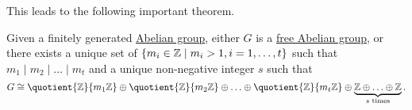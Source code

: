 This leads to the following important theorem.

\begin{theorem}\label{thm:fundamental-theorem-of-finitely-generalted-Abelian-group}
	Given a finitely generated \hyperref[def:Abelian-group]{Abelian group}, either \(G\) is a \hyperref[def:free-Abelian-group]{free Abelian group}, or there exists
	a unique set of \(\{m_{i}\in \mathbb{\MakeUppercase{z}} \mid  m_{i} > 1, i = 1, \ldots , t \}\) such that \(m_1 \mid m_2 \mid \ldots \mid m_t \) and a unique non-negative integer \(s\)
	such that
	\[
		G\cong \quotient{\mathbb{\MakeUppercase{z}} }{m_1 \mathbb{\MakeUppercase{z}} } \oplus \quotient{\mathbb{\MakeUppercase{z}} }{m_2 \mathbb{\MakeUppercase{z}} } \oplus \ldots \oplus \quotient{\mathbb{\MakeUppercase{z}} }{m_t \mathbb{\MakeUppercase{z}} }  \oplus \underbrace{\mathbb{\MakeUppercase{z}} \oplus \ldots \oplus \mathbb{\MakeUppercase{z}}  }_{s \text{ times}}.
	\]
\end{theorem}
